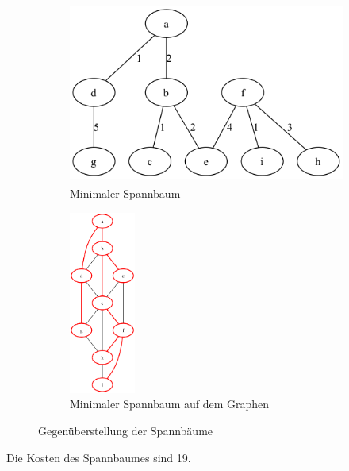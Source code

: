 \documentclass[a4paper,11pt]{report}
\begin{document}
    \begin{figure}[htbp]
        \centering
        \begin{subfigure}[b]{0.45\textwidth}
            \centering
            \includegraphics[width=\textwidth, height=6cm, keepaspectratio]{a02a_mst}
            \caption{Minimaler Spannbaum}
            \label{fig:a02_mst}
        \end{subfigure}
        \begin{subfigure}[b]{0.45\textwidth}
            \centering
            \includegraphics[width=\textwidth, height=6cm, keepaspectratio]{a02a_graph_highlighted}
            \caption{Minimaler Spannbaum auf dem Graphen}
            \label{fig:a02_graph_highlighted}
        \end{subfigure}
        \caption{Gegenüberstellung der Spannbäume}
        \label{fig:a02_comparison}
    \end{figure}

    Die Kosten des Spannbaumes sind 19.

    \newpage
\end{document}
